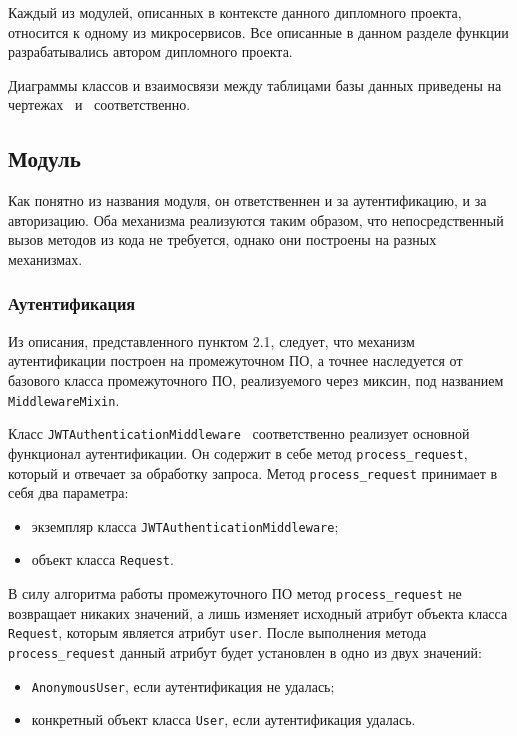 Каждый из модулей, описанных в контексте данного дипломного проекта, относится к одному из микросервисов.
Все описанные в данном разделе функции разрабатывались автором дипломного проекта.

Диаграммы классов и взаимосвязи между таблицами базы данных приведены на чертежах \seqIcdScheme\ и \seqGooseScheme\ соответственно. %

\subsection{Модуль \moduleAuth}\label{subsec:func:module-auth}
Как понятно из названия модуля, он ответственнен и за аутентификацию, и за авторизацию.
Оба механизма реализуются таким образом, что непосредственный вызов методов из кода не требуется, однако они построены на разных механизмах.

\subsubsection{Аутентификация}\label{subsubsec:func:module-authentication}
Из описания, представленного пунктом 2.1, следует, что механизм аутентификации построен на промежуточном ПО, а точнее наследуется
от базового класса промежуточного ПО, реализуемого через миксин, под названием \lstinline{MiddlewareMixin}. %

Класс \lstinline{JWTAuthenticationMiddleware} ~соответственно реализует основной функционал аутентификации.
Он содержит в себе метод \lstinline{process_request}, который и отвечает за обработку запроса.
Метод \lstinline{process_request} принимает в себя два параметра:
\begin{itemize}
    \item экземпляр класса \lstinline{JWTAuthenticationMiddleware};
    \item объект класса \lstinline{Request}.
\end{itemize}

В силу алгоритма работы промежуточного ПО метод \lstinline{process_request} не возвращает никаких значений,
а лишь изменяет исходный атрибут объекта класса \lstinline{Request}, которым является атрибут \lstinline{user}.
После выполнения метода \lstinline{process_request} данный атрибут будет установлен в одно из двух значений:
\begin{itemize}
    \item \lstinline{AnonymousUser}, если аутентификация не удалась;
    \item конкретный объект класса \lstinline{User}, если аутентификация удалась.
\end{itemize}

